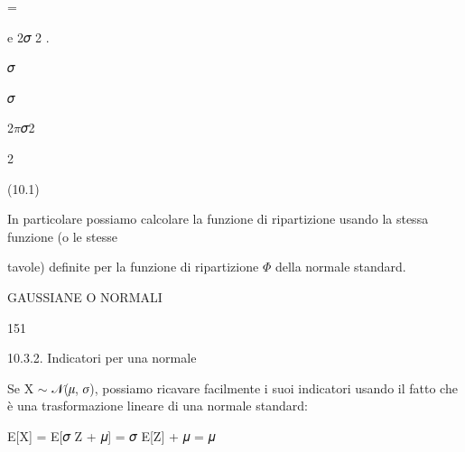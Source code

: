 \documentclass[a4paper,portrait,12pt]{article}
\begin{document}
=


\begin{flushleft}
e 2𝜎 2 .
\end{flushleft}


\begin{flushleft}
𝜎
\end{flushleft}


\begin{flushleft}
𝜎
\end{flushleft}


\begin{flushleft}
2$\pi$𝜎2
\end{flushleft}


2





(10.1)





\begin{flushleft}
In particolare possiamo calcolare la funzione di ripartizione usando la stessa funzione (o le stesse
\end{flushleft}


\begin{flushleft}
tavole) definite per la funzione di ripartizione $\Phi$ della normale standard.
\end{flushleft}





\begin{flushleft}
 GAUSSIANE O NORMALI
\end{flushleft}





151





\begin{flushleft}
10.3.2. Indicatori per una normale
\end{flushleft}


\begin{flushleft}
Se X $\sim$ 𝒩(𝜇, 𝜎), possiamo ricavare facilmente i suoi indicatori usando il fatto che \`{e} una trasformazione lineare di una normale standard:
\end{flushleft}


\begin{flushleft}
E[X] = E[𝜎 Z + 𝜇] = 𝜎 E[Z] + 𝜇 = 𝜇
\end{flushleft}
\end{document}
